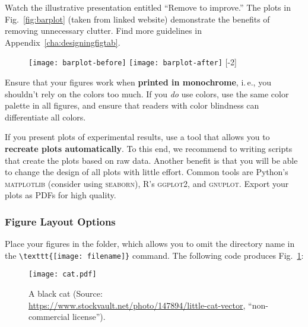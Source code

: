 Watch the illustrative presentation entitled ``Remove to improve.'' The plots in Fig.~\ref{fig:barplot} (taken from linked website) demonstrate the benefits of removing unnecessary clutter. Find more guidelines in Appendix~\ref{cha:designingfigtab}.


\begin{figure}[t]
\centering
\texttt{[image: barplot-before]}%
\hspace{\fill}%
\texttt{[image: barplot-after]}
[-2\baselineskip]
\end{figure}


Ensure that your figures work when \textbf{printed in monochrome}, i.\,e., you shouldn't rely on the colors too much. If you \emph{do} use colors, use the same color palette in all figures, and ensure that readers with color blindness can differentiate all colors.

If you present plots of experimental results, use a tool that allows you to \textbf{recreate plots automatically}. To this end, we recommend to writing scripts that create the plots based on raw data. Another benefit is that you will be able to change the design of all plots with little effort.%
Common tools are Python's \textsc{matplotlib} (consider using \textsc{seaborn}), R's \textsc{ggplot2}, and \textsc{gnuplot}. Export your plots as PDFs for high quality.

\subsubsection{Figure Layout Options}

Place your figures in the  folder, which allows you to omit the directory name in the \verb|\texttt{[image: filename]}| command.
The following code produces Fig.~\ref{fig:cat}:
\begin{latex}
\begin{figure}[t] %
\centering
\texttt{[image: cat.pdf]}
\decoRule
\caption[A black cat]{A black cat (Source: \url{https://www.stockvault.net/photo/147894/little-cat-vector}, ``non-commercial license'').}
\label{fig:cat}
\end{figure}
\end{latex}

